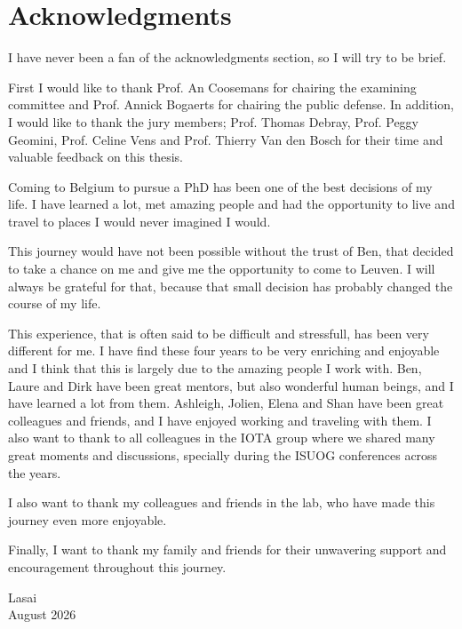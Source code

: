 \chapter*{Acknowledgments}

I have never been a fan of the acknowledgments section, so I will try to be brief.

First I would like to thank Prof. An Coosemans for chairing the examining committee and Prof. Annick Bogaerts for chairing the public defense. In addition, I would like to thank the jury members; Prof. Thomas Debray, Prof. Peggy Geomini, Prof. Celine Vens and Prof. Thierry Van den Bosch for their time and valuable feedback on this thesis.

Coming to Belgium to pursue a PhD has been one of the best decisions of my life. I have learned a lot, met amazing people and had the opportunity to live and travel to places I would never imagined I would. 

This journey would have not been possible without the trust of Ben, that decided to take a chance on me and give me the opportunity to come to Leuven. I will always be grateful for that, because that small decision has probably changed the course of my life. 

This experience, that is often said to be difficult and stressfull, has been very different for me. I have find these four years to be very enriching and enjoyable and I think that this is largely due to the amazing people I work with. Ben, Laure and Dirk have been great mentors, but also wonderful human beings, and I have learned a lot from them. Ashleigh, Jolien, Elena and Shan have been great colleagues and friends, and I have enjoyed working and traveling with them. I also want to thank to all colleagues in the IOTA group where we shared many great moments and discussions, specially during the ISUOG conferences across the years. 



 I also want to thank my colleagues and friends in the lab, who have made this journey even more enjoyable.

Finally, I want to thank my family and friends for their unwavering support and encouragement throughout this journey.





{\raggedleft
Lasai \\
August 2026 \\
}